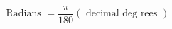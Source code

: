 \documentclass[12pt]{article}
\begin{document}
\begin{displaymath}
\text { Radians }=\frac{\pi}{180}(\text { decimal deg rees })
\end{displaymath}
\end{document}
